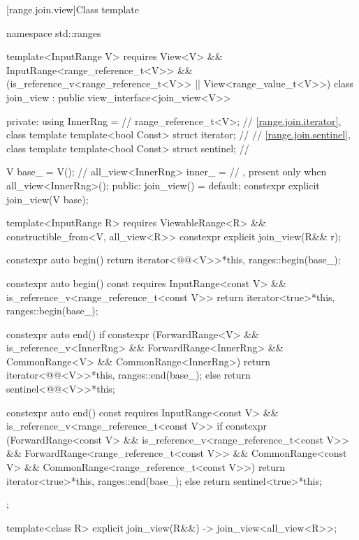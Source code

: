 [range.join.view]{Class template }

\begin{codeblock}
namespace std::ranges {
  template<InputRange V>
    requires View<V> && InputRange<range_reference_t<V>> &&
             (is_reference_v<range_reference_t<V>> ||
              View<range_value_t<V>>)
  class join_view : public view_interface<join_view<V>> {
  private:
    using InnerRng =                    // \expos
      range_reference_t<V>;
    // \ref{range.join.iterator}, class template 
    template<bool Const>
      struct iterator;                  // \expos
    // \ref{range.join.sentinel}, class template 
    template<bool Const>
      struct sentinel;                  // \expos

    V base_ = V();                      // \expos
    all_view<InnerRng> inner_ =         // \expos, present only when 
      all_view<InnerRng>();
  public:
    join_view() = default;
    constexpr explicit join_view(V base);

    template<InputRange R>
      requires ViewableRange<R> && constructible_from<V, all_view<R>>
    constexpr explicit join_view(R&& r);

    constexpr auto begin() {
      return iterator<@@<V>>{*this, ranges::begin(base_)};
    }

    constexpr auto begin() const
    requires InputRange<const V> &&
             is_reference_v<range_reference_t<const V>> {
      return iterator<true>{*this, ranges::begin(base_)};
    }

    constexpr auto end() {
      if constexpr (ForwardRange<V> &&
                    is_reference_v<InnerRng> && ForwardRange<InnerRng> &&
                    CommonRange<V> && CommonRange<InnerRng>)
        return iterator<@@<V>>{*this, ranges::end(base_)};
      else
        return sentinel<@@<V>>{*this};
    }

    constexpr auto end() const
    requires InputRange<const V> &&
             is_reference_v<range_reference_t<const V>> {
      if constexpr (ForwardRange<const V> &&
                    is_reference_v<range_reference_t<const V>> &&
                    ForwardRange<range_reference_t<const V>> &&
                    CommonRange<const V> &&
                    CommonRange<range_reference_t<const V>>)
        return iterator<true>{*this, ranges::end(base_)};
      else
        return sentinel<true>{*this};
    }
  };

  template<class R>
    explicit join_view(R&&) -> join_view<all_view<R>>;
}
\end{codeblock}

